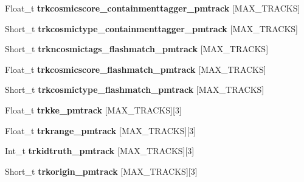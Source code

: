 \begin{DoxyCompactItemize}
\item 
\hypertarget{classanatree_a9d24db71f0761252055c3dbc049aaab6}{Float\-\_\-t {\bfseries trkcosmicscore\-\_\-containmenttagger\-\_\-pmtrack} \mbox{[}M\-A\-X\-\_\-\-T\-R\-A\-C\-K\-S\mbox{]}}\label{classanatree_a9d24db71f0761252055c3dbc049aaab6}

\item 
\hypertarget{classanatree_a93f811617f430448d8b39f7c5329d09e}{Short\-\_\-t {\bfseries trkcosmictype\-\_\-containmenttagger\-\_\-pmtrack} \mbox{[}M\-A\-X\-\_\-\-T\-R\-A\-C\-K\-S\mbox{]}}\label{classanatree_a93f811617f430448d8b39f7c5329d09e}

\item 
\hypertarget{classanatree_a611c36f3d47daa5400da697ca9c4da77}{Short\-\_\-t {\bfseries trkncosmictags\-\_\-flashmatch\-\_\-pmtrack} \mbox{[}M\-A\-X\-\_\-\-T\-R\-A\-C\-K\-S\mbox{]}}\label{classanatree_a611c36f3d47daa5400da697ca9c4da77}

\item 
\hypertarget{classanatree_a0d7f1227e5a1cc04e53bec32972760a1}{Float\-\_\-t {\bfseries trkcosmicscore\-\_\-flashmatch\-\_\-pmtrack} \mbox{[}M\-A\-X\-\_\-\-T\-R\-A\-C\-K\-S\mbox{]}}\label{classanatree_a0d7f1227e5a1cc04e53bec32972760a1}

\item 
\hypertarget{classanatree_a142fa7ffc0bf06b4afd54da839cf7032}{Short\-\_\-t {\bfseries trkcosmictype\-\_\-flashmatch\-\_\-pmtrack} \mbox{[}M\-A\-X\-\_\-\-T\-R\-A\-C\-K\-S\mbox{]}}\label{classanatree_a142fa7ffc0bf06b4afd54da839cf7032}

\item 
\hypertarget{classanatree_a356f241fe10ef56e6176bae32d45a35e}{Float\-\_\-t {\bfseries trkke\-\_\-pmtrack} \mbox{[}M\-A\-X\-\_\-\-T\-R\-A\-C\-K\-S\mbox{]}\mbox{[}3\mbox{]}}\label{classanatree_a356f241fe10ef56e6176bae32d45a35e}

\item 
\hypertarget{classanatree_aea6afedcdbcb8d214b59f011942cbe21}{Float\-\_\-t {\bfseries trkrange\-\_\-pmtrack} \mbox{[}M\-A\-X\-\_\-\-T\-R\-A\-C\-K\-S\mbox{]}\mbox{[}3\mbox{]}}\label{classanatree_aea6afedcdbcb8d214b59f011942cbe21}

\item 
\hypertarget{classanatree_a69032230d4731245f88a9082578f4263}{Int\-\_\-t {\bfseries trkidtruth\-\_\-pmtrack} \mbox{[}M\-A\-X\-\_\-\-T\-R\-A\-C\-K\-S\mbox{]}\mbox{[}3\mbox{]}}\label{classanatree_a69032230d4731245f88a9082578f4263}

\item 
\hypertarget{classanatree_a7cc04d8810c750538e720b7f681323ea}{Short\-\_\-t {\bfseries trkorigin\-\_\-pmtrack} \mbox{[}M\-A\-X\-\_\-\-T\-R\-A\-C\-K\-S\mbox{]}\mbox{[}3\mbox{]}}\label{classanatree_a7cc04d8810c750538e720b7f681323ea}


\end{DoxyCompactItemize}
